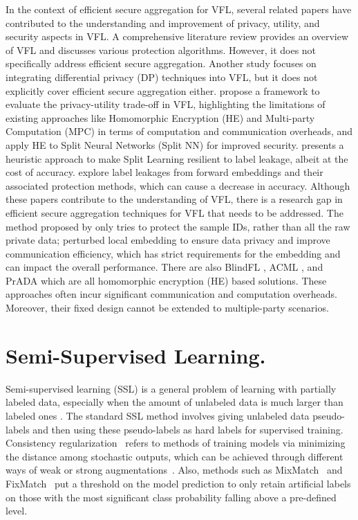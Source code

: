 \documentclass[withindex,glossary]{cam-thesis}
\begin{document}
In the context of efficient secure aggregation for VFL, several related papers have contributed to the understanding and improvement of privacy, utility, and security aspects in VFL. A comprehensive literature review \citep{vfl} provides an overview of VFL and discusses various protection algorithms. However, it does not specifically address efficient secure aggregation. Another study \citep{dpvfl} focuses on integrating differential privacy (DP) techniques into VFL, but it does not explicitly cover efficient secure aggregation either. 
\citet{tradeoffvfl} propose a framework to evaluate the privacy-utility trade-off in VFL, highlighting the limitations of existing approaches like Homomorphic Encryption (HE) and Multi-party Computation (MPC) in terms of computation and communication overheads, and \citet{cai2023secure} apply HE to Split Neural Networks (Split NN) for improved security. \citet{zheng2022making} presents a heuristic approach to make Split Learning resilient to label leakage, albeit at the cost of accuracy. \citet{sun2022label} explore label leakages from forward embeddings and their associated protection methods, which can cause a decrease in accuracy. Although these papers contribute to the understanding of VFL, there is a research gap in efficient secure aggregation techniques for VFL that needs to be addressed. The method proposed by \citet{liu2020asymmetrical} only tries to protect the sample IDs, rather than all the raw private data; \citet{chen2020vafl} perturbed local embedding to ensure data privacy and improve communication efficiency, which has strict requirements for the embedding and can impact the overall performance. There are also BlindFL \citep{fu2022blindfl}, ACML \citep{zhang2020acml}, and PrADA \citep{ kang2022prada} which are all homomorphic encryption (HE) based solutions. These approaches often incur significant communication and computation overheads. Moreover, their fixed design cannot be extended to multiple-party scenarios.

\section{Semi-Supervised Learning.} Semi-supervised learning (SSL) is a general problem of learning with partially labeled data, especially when the amount of unlabeled data is much larger than labeled ones \citep{zhou2005tri, rasmus2015semi}. The standard SSL method involves giving unlabeled data pseudo-labels \citep{lee2013pseudo} and then using these pseudo-labels as hard labels for supervised training. Consistency regularization~\citep{bachman2014learning} refers to methods of training models via minimizing the distance among stochastic outputs, which can be achieved through different ways of weak or strong augmentations~\citep{cubuk2020randaugment, thulasidasan2019mixup, french2017self}. Also, methods such as MixMatch~\citep{mixmatch} and FixMatch~\citep{fixmatch} put a threshold on the model prediction to only retain artificial labels on those with the most significant class probability falling above a pre-defined level.  
\end{document}
